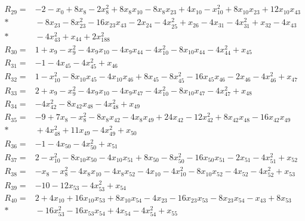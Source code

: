 \begin{align*}
R_{29} ={}& -2 - x_{0} + 8x_{8} - 2x_{8}^{2} + 8x_{8}x_{10} - 8x_{8}x_{23} + 4x_{10} - x_{10}^{2} + 8x_{10}x_{23} + 12x_{10}x_{43} \\*
&{} - 8x_{23} - 8x_{23}^{2} - 16x_{23}x_{43} - 2x_{24} - 4x_{25}^{2} + x_{26} - 4x_{31} - 4x_{31}^{2} + x_{32} - 4x_{43} \\*
&{} - 4x_{43}^{2} + x_{44} + 2x_{188}^{2} \\[4pt]
R_{30} ={}& 1 + x_{9} - x_{9}^{2} - 4x_{9}x_{10} - 4x_{9}x_{44} - 4x_{10}^{2} - 8x_{10}x_{44} - 4x_{44}^{2} + x_{45} \\[4pt]
R_{31} ={}& -1 - 4x_{45} - 4x_{45}^{2} + x_{46} \\[4pt]
R_{32} ={}& 1 - x_{10}^{2} - 8x_{10}x_{45} - 4x_{10}x_{46} + 8x_{45} - 8x_{45}^{2} - 16x_{45}x_{46} - 2x_{46} - 4x_{46}^{2} + x_{47} \\[4pt]
R_{33} ={}& 2 + x_{9} - x_{9}^{2} - 4x_{9}x_{10} - 4x_{9}x_{47} - 4x_{10}^{2} - 8x_{10}x_{47} - 4x_{47}^{2} + x_{48} \\[4pt]
R_{34} ={}& -4x_{42}^{2} - 8x_{42}x_{48} - 4x_{48}^{2} + x_{49} \\[4pt]
R_{35} ={}& -9 + 7x_{8} - x_{8}^{2} - 8x_{8}x_{42} - 4x_{8}x_{49} + 24x_{42} - 12x_{42}^{2} + 8x_{42}x_{48} - 16x_{42}x_{49} \\*
&{} + 4x_{48}^{2} + 11x_{49} - 4x_{49}^{2} + x_{50} \\[4pt]
R_{36} ={}& -1 - 4x_{50} - 4x_{50}^{2} + x_{51} \\[4pt]
R_{37} ={}& 2 - x_{10}^{2} - 8x_{10}x_{50} - 4x_{10}x_{51} + 8x_{50} - 8x_{50}^{2} - 16x_{50}x_{51} - 2x_{51} - 4x_{51}^{2} + x_{52} \\[4pt]
R_{38} ={}& -x_{8} - x_{8}^{2} - 4x_{8}x_{10} - 4x_{8}x_{52} - 4x_{10} - 4x_{10}^{2} - 8x_{10}x_{52} - 4x_{52} - 4x_{52}^{2} + x_{53} \\[4pt]
R_{39} ={}& -10 - 12x_{53} - 4x_{53}^{2} + x_{54} \\[4pt]
R_{40} ={}& 2 + 4x_{10} + 16x_{10}x_{53} + 8x_{10}x_{54} - 4x_{23} - 16x_{23}x_{53} - 8x_{23}x_{54} - x_{43} + 8x_{53} \\*
&{} - 16x_{53}^{2} - 16x_{53}x_{54} + 4x_{54} - 4x_{54}^{2} + x_{55} \\[4pt]

\end{align*}
